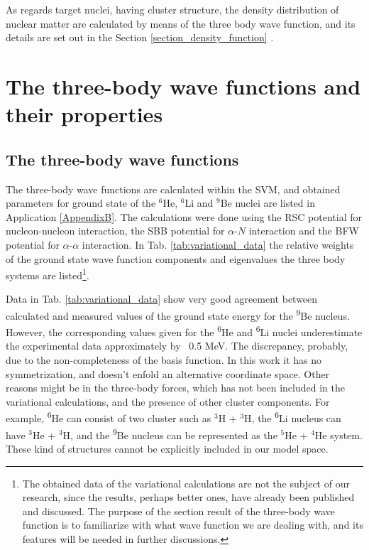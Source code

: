 \documentclass[
12pt, %
oneside, %
english, %
onehalfspacing, %
onehalfspacing, %
headsepline, %
]{MastersDoctoralThesis} %
\newcommand{\he}{\textsuperscript{6}He\xspace}
\newcommand{\li}{\textsuperscript{6}Li\xspace}
\newcommand{\be}{\textsuperscript{9}Be\xspace}
\begin{document}
  
As regards target nuclei, having cluster structure, the density distribution of nuclear matter are calculated by means of the three body wave function, and its details are set out in the Section \ref{section_density_function} .

\chapter{The three-body wave functions and their properties}

\section{The three-body wave functions}
\label{section:3bwf}
The three-body wave functions are calculated within the SVM, and obtained parameters for ground state of the $^6$He, $^6$Li and $^9$Be nuclei are listed in Application \ref{AppendixB}. 
The calculations were done using the RSC potential \cite{day1981three} for nucleon-nucleon interaction, 
the SBB potential \cite{sack1954elastic} for  $\alpha$-$N$ interaction and the BFW potential \cite{buck1977local} for $\alpha$-$\alpha$ interaction.  
In Tab. \ref{tab:variational_data} the relative weights of the ground state wave function components and eigenvalues the three body systems are listed\footnote{The obtained data of the variational calculations are not the subject of our research, since the results, perhaps better ones, have already been published and discussed. The purpose of  the section result of the three-body wave function   is to familiarize with what wave function we are dealing with, and its features will be needed in further discussions.}.

Data in Tab. \ref{tab:variational_data} show very good agreement between calculated and measured values of the ground state energy for the \be nucleus.
However, the corresponding values given for the \he and \li nuclei underestimate the experimental data approximately by ~0.5 MeV. 
The discrepancy, probably, due to the non-completeness of the basis function. 
In this work it has no symmetrization, and doesn't enfold an alternative coordinate space.
Other reasons might be in the three-body forces, which has not been included in the variational calculations, and the presence of other cluster components. 
For example, \he can consist of two cluster such as $^3$H + $^3$H, 
the \li nucleus can have $^3$He + $^3$H, and the \be nucleus can be represented as the $^5$He + $^4$He system.
These kind of structures cannot be explicitly included in our model space.
 
\end{document}
